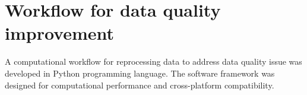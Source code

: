 \section{Workflow for data quality improvement}
A computational workflow for reprocessing data to address data quality
issue was developed in Python programming language. The software
framework was designed for computational performance and cross-platform
compatibility.












